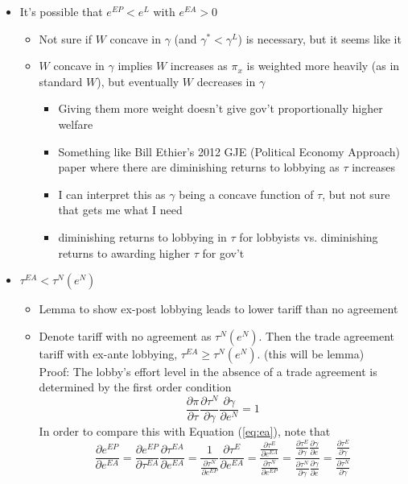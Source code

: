 \documentclass[12pt]{article}
\newcommand{\ga}{\gamma}
\begin{document}
\begin{itemize}
	 \item It's possible that $e^{EP} < e^{L}$ with $e^{EA} > 0$
		\begin{itemize}
			\item Not sure if $W$ concave in $\ga$ (and $\ga^* < \ga^L$) is necessary, but it seems like it
			\item $W$ concave in $\ga$ implies $W$ increases as $\pi_x$ is weighted more heavily (as in standard $W$), but eventually $W$ decreases in $\ga$
				\begin{itemize}
					\item Giving them more weight doesn't give gov't proportionally higher welfare
					\item Something like Bill Ethier's 2012 GJE (Political Economy Approach) paper where there are diminishing returns to lobbying as $\tau$ increases
					\item I can interpret this as $\ga$ being a concave function of $\tau$, but not sure that gets me what I need
					\item diminishing returns to lobbying in $\tau$ for lobbyists vs. diminishing returns to awarding higher $\tau$ for gov't
				\end{itemize}
		\end{itemize}
	\item $\tau^{EA} < \tau^N(e^N)$
		\begin{itemize}
			\item Lemma to show ex-post lobbying leads to lower tariff than no agreement
			\item Denote tariff with no agreement as $\tau^N(e^N)$. Then the trade agreement tariff with ex-ante lobbying, $\tau^{EA} \geq \tau^N(e^N)$. (this will be lemma) \\
			Proof: The lobby's effort level in the absence of a trade agreement is determined by the first order condition
				\begin{equation}
						\frac{\partial \pi}{\partial \tau} \frac{\partial \tau^N}{\partial \ga} \frac{\partial \ga}{\partial e^N} = 1
						\label{eq:nta}
				\end{equation}
			In order to compare this with Equation (\ref{eq:ea}), note that
			  \[
				  \frac{\partial e^{EP}}{\partial e^{EA}} = \frac{\partial e^{EP}}{\partial \tau^{EA}} \frac{\partial \tau^{EA}}{\partial e^{EA}} = \frac{1}{\frac{\partial \tau^N}{\partial e^{EP}}} \frac{\partial \tau^{E}}{\partial e^{EA}} =  \frac{\frac{\partial \tau^{E}}{\partial e^{EA}}}{\frac{\partial \tau^N}{\partial e^{EP}}} =  \frac{\frac{\partial \tau^{E}}{\partial \ga}\frac{\partial \ga}{\partial e}}{\frac{\partial \tau^N}{\partial \ga}\frac{\partial \ga}{\partial e}} =  \frac{\frac{\partial \tau^{E}}{\partial \ga}}{\frac{\partial \tau^N}{\partial \ga}} 
\]
\end{itemize}
\end{itemize}
\end{document}
